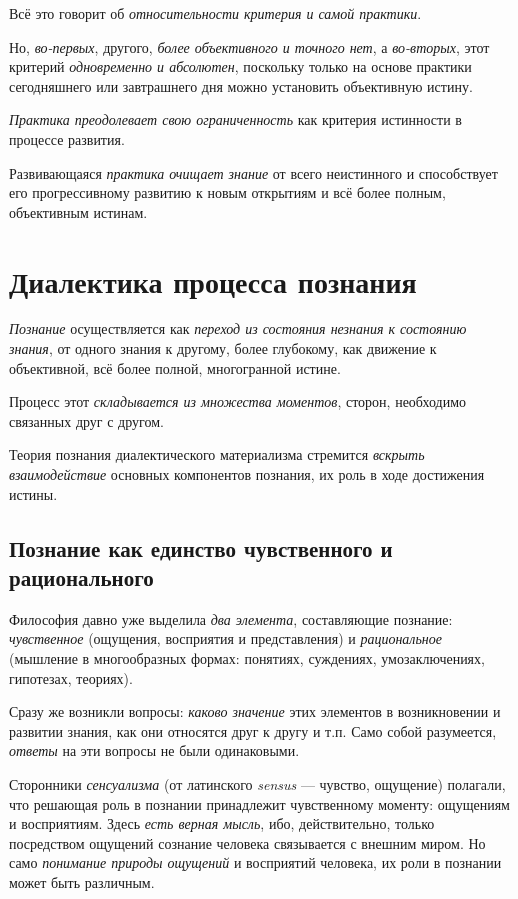 \documentclass[a4paper,14pt,russian]{extreport}
\begin{document}
Всё это говорит об \emph{относительности критерия и самой практики}.

Но, \emph{во-первых}, другого, \emph{более объективного и точного нет}, а \emph{во-вторых}, этот критерий \emph{одновременно и абсолютен}, поскольку только на основе практики сегодняшнего или завтрашнего дня можно установить объективную истину.

\emph{Практика преодолевает свою ограниченность} как критерия истинности в процессе развития.

Развивающаяся \emph{практика очищает знание} от всего неистинного и способствует его прогрессивному развитию к новым открытиям и всё более полным, объективным истинам.

\section{Диалектика процесса познания}

\emph{Познание} осуществляется как \emph{переход из состояния незнания к состоянию знания}, от одного знания к другому, более глубокому, как движение к объективной, всё более полной, многогранной истине.

Процесс этот \emph{складывается из множества моментов}, сторон, необходимо связанных друг с другом.

Теория познания диалектического материализма стремится \emph{вскрыть} \emph{взаимодействие} основных компонентов познания, их роль в ходе достижения истины.

\subsection{Познание как единство чувственного и рационального}

Философия давно уже выделила \emph{два элемента}, составляющие познание: \emph{чувственное} (ощущения, восприятия и представления) и \emph{рациональное} (мышление в многообразных формах: понятиях, суждениях, умозаключениях, гипотезах, теориях).

Сразу же возникли вопросы: \emph{каково значение} этих элементов в возникновении и развитии знания, как они относятся друг к другу и т.п. Само собой разумеется, \emph{ответы} на эти вопросы не были одинаковыми.

Сторонники \emph{сенсуализма} (от латинского \emph{sensus} --- чувство, ощущение) полагали, что решающая роль в познании принадлежит чувственному моменту: ощущениям и восприятиям. Здесь \emph{есть верная мысль}, ибо, действительно, только посредством ощущений сознание человека связывается с внешним миром. Но само \emph{понимание природы ощущений} и восприятий человека, их роли в познании может быть различным.
\end{document}
